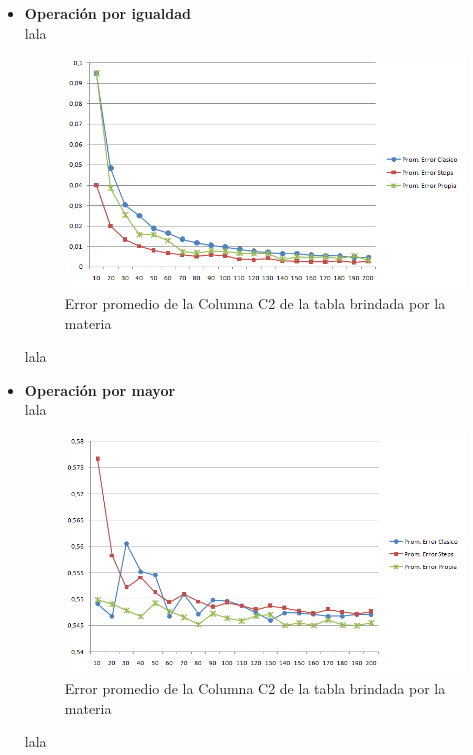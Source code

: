 \begin{itemize}
\item \textbf{Operaci\'on por igualdad} \\

\quad lala \\

\begin{figure}[H]
	  \begin{center}
	    \includegraphics[scale=.80]{imagenes/parametroVariableC2Eq.png}
	    \caption{Error promedio de la Columna C2 de la tabla brindada por la materia} 
	    \label{fig:C2_variando_paremetro}
	  \end{center}
\end{figure}

\quad lala \\

\item \textbf{Operaci\'on por mayor} \\

\quad lala \\

\begin{figure}[H]
	  \begin{center}
	    \includegraphics[scale=.80]{imagenes/parametroVariableC2Greater.png}
	    \caption{Error promedio de la Columna C2 de la tabla brindada por la materia} 
	    \label{fig:C2_variando_paremetro_greater}
	  \end{center}
\end{figure}

\quad lala \\

\end{itemize}